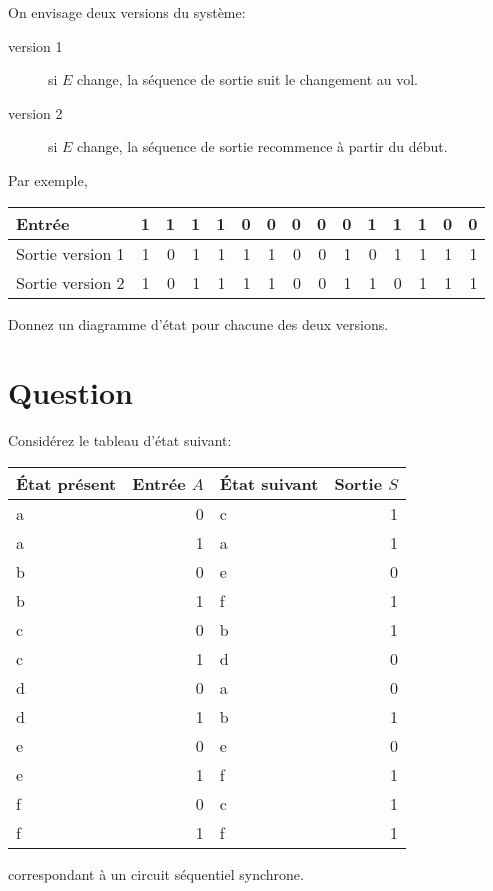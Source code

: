 \documentclass[letter, oneside]{book}
\begin{document}
On envisage deux versions du système:

\begin{description}
\item[{version 1}] si  \(E\) change, la séquence de sortie suit le
changement au vol.

\item[{version 2}] si \(E\) change, la séquence de sortie recommence à
partir du début.
\end{description}

Par exemple,
\begin{center}
\begin{tabular}{lrrrrrrrrrrrrrr}
Entrée & 1 & 1 & 1 & 1 & 0 & 0 & 0 & 0 & 0 & 1 & 1 & 1 & 0 & 0\\[0pt]
\hline
Sortie version 1 & 1 & 0 & 1 & 1 & 1 & 1 & 0 & 0 & 1 & 0 & 1 & 1 & 1 & 1\\[0pt]
Sortie version 2 & 1 & 0 & 1 & 1 & 1 & 1 & 0 & 0 & 1 & 1 & 0 & 1 & 1 & 1\\[0pt]
\end{tabular}
\end{center}

Donnez un diagramme d'état pour chacune des deux versions.

\section*{Question}
\label{sec:orgf847ddf}
Considérez le tableau d'état suivant:
\begin{center}
\begin{tabular}{lrlr}
État présent & Entrée \(A\) & État suivant & Sortie \(S\)\\[0pt]
\hline
a & 0 & c & 1\\[0pt]
a & 1 & a & 1\\[0pt]
b & 0 & e & 0\\[0pt]
b & 1 & f & 1\\[0pt]
c & 0 & b & 1\\[0pt]
c & 1 & d & 0\\[0pt]
d & 0 & a & 0\\[0pt]
d & 1 & b & 1\\[0pt]
e & 0 & e & 0\\[0pt]
e & 1 & f & 1\\[0pt]
f & 0 & c & 1\\[0pt]
f & 1 & f & 1\\[0pt]
\end{tabular}
\end{center}
correspondant à un circuit séquentiel synchrone.
\end{document}
